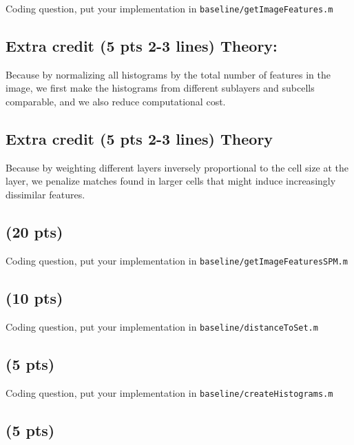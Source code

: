 \documentclass[12pt]{article}
\newcounter{list}
\begin{document}
Coding question, put your implementation in \verb+baseline/getImageFeatures.m+



\subsection{Extra credit (5 pts 2-3 lines) Theory:}
Because by normalizing all histograms by the total number of features in the image, we first make the histograms from different sublayers and subcells comparable, and we also reduce computational cost.

\subsection{Extra credit (5 pts 2-3 lines) Theory}

Because by weighting different layers inversely proportional to the cell size at the layer, we penalize matches found in larger cells that might induce increasingly dissimilar features.

\subsection{(20 pts)}

Coding question, put your implementation in \verb+baseline/getImageFeaturesSPM.m+



\subsection{(10 pts)}

Coding question, put your implementation in \verb+baseline/distanceToSet.m+



\subsection{(5 pts)}

Coding question, put your implementation in \verb+baseline/createHistograms.m+



\subsection{(5 pts)}
\end{document}
